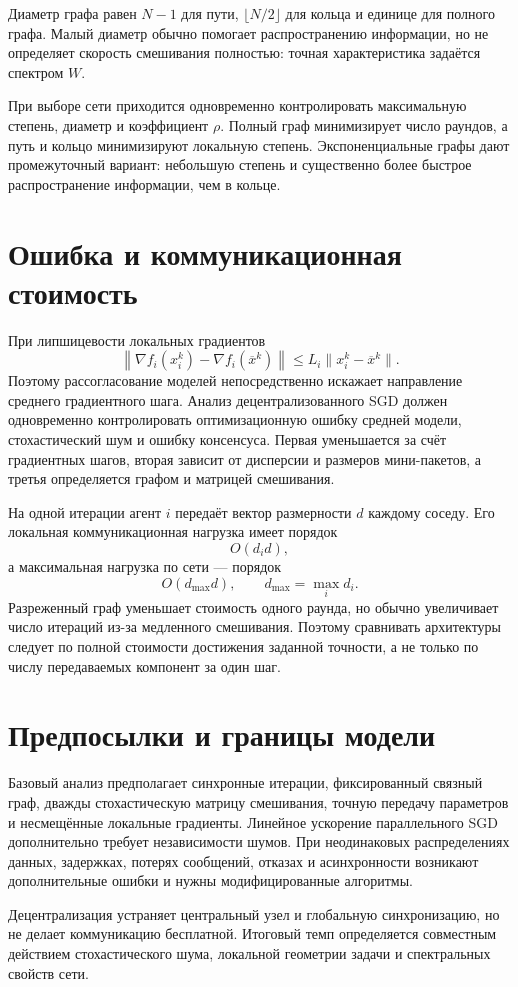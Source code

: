 Диаметр графа равен \(N-1\) для пути,
\(\lfloor N/2\rfloor\) для кольца и единице для полного графа.
Малый диаметр обычно помогает распространению информации, но не
определяет скорость смешивания полностью: точная характеристика
задаётся спектром \(W\).

При выборе сети приходится одновременно контролировать максимальную
степень, диаметр и коэффициент \(\rho\). Полный граф минимизирует
число раундов, а путь и кольцо минимизируют локальную степень.
Экспоненциальные графы дают промежуточный вариант: небольшую степень и
существенно более быстрое распространение информации, чем в кольце.

\section{Ошибка и коммуникационная стоимость}

При липшицевости локальных градиентов
\[
    \left\lVert
        \nabla f_i(x_i^k)
        -
        \nabla f_i(\overline x^k)
    \right\rVert
    \le
    L_i
    \lVert
        x_i^k-\overline x^k
    \rVert.
\]
Поэтому рассогласование моделей непосредственно искажает направление
среднего градиентного шага. Анализ децентрализованного SGD должен
одновременно контролировать оптимизационную ошибку средней модели,
стохастический шум и ошибку консенсуса. Первая уменьшается за счёт
градиентных шагов, вторая зависит от дисперсии и размеров
мини-пакетов, а третья определяется графом и матрицей смешивания.

На одной итерации агент \(i\) передаёт вектор размерности \(d\)
каждому соседу. Его локальная коммуникационная нагрузка имеет порядок
\[
    O(d_i d),
\]
а максимальная нагрузка по сети --- порядок
\[
    O(d_{\max}d),
    \qquad
    d_{\max}
    =
    \max_i d_i.
\]
Разреженный граф уменьшает стоимость одного раунда, но обычно
увеличивает число итераций из-за медленного смешивания. Поэтому
сравнивать архитектуры следует по полной стоимости достижения заданной
точности, а не только по числу передаваемых компонент за один шаг.

\section{Предпосылки и границы модели}

Базовый анализ предполагает синхронные итерации, фиксированный
связный граф, дважды стохастическую матрицу смешивания, точную передачу
параметров и несмещённые локальные градиенты. Линейное ускорение
параллельного SGD дополнительно требует независимости шумов. При
неодинаковых распределениях данных, задержках, потерях сообщений,
отказах и асинхронности возникают дополнительные ошибки и нужны
модифицированные алгоритмы.

Децентрализация устраняет центральный узел и глобальную
синхронизацию, но не делает коммуникацию бесплатной. Итоговый темп
определяется совместным действием стохастического шума, локальной
геометрии задачи и спектральных свойств сети.
